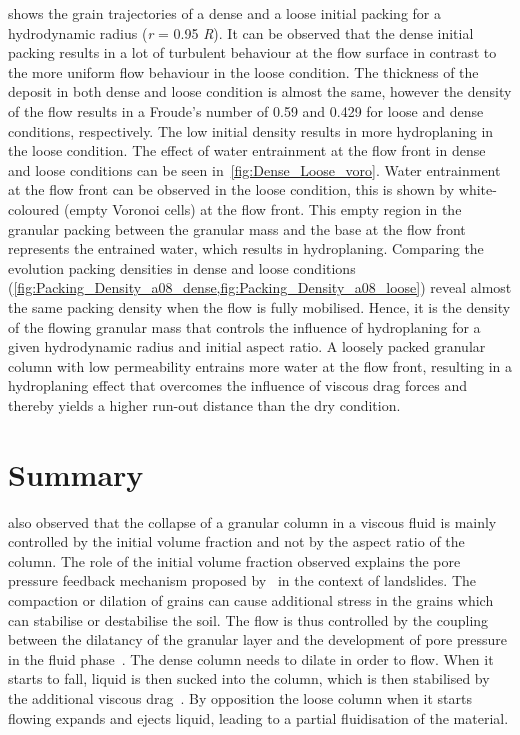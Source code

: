 \documentclass[12pt,a4paper,twocolumn,fleqn]{narms}
\begin{document}
 shows the grain trajectories of a dense and a loose 
initial packing for a hydrodynamic radius (\textit{r} = 0.95 \textit{R}). It 
can be observed that 
the dense initial packing results in a lot of turbulent behaviour at the flow 
surface in contrast to the more uniform flow behaviour in the loose condition. 
The thickness of the deposit in both dense and loose condition is almost the 
same, however the density of the flow results in a Froude's number of 0.59 and
0.429 for loose and dense conditions, respectively. The low initial density 
results in more hydroplaning in the loose condition. The effect of water 
entrainment at the flow front in dense and loose conditions can be seen 
in~\cref{fig:Dense_Loose_voro}. Water entrainment at the flow front can be 
observed in the loose condition, this is shown by white-coloured (empty Voronoi 
cells) at the flow front. This empty region in the granular packing between the 
granular mass and the base at the flow front represents the entrained water, 
which results in hydroplaning. Comparing the evolution packing densities in 
dense and loose conditions
(\cref{fig:Packing_Density_a08_dense,fig:Packing_Density_a08_loose}) 
reveal almost the same packing density when the flow is fully mobilised. Hence, 
it is the density of the flowing granular mass that controls the influence of 
hydroplaning for a given hydrodynamic radius and initial aspect ratio. A 
loosely packed granular column with low permeability entrains 
more water at the flow front, resulting in a hydroplaning effect that overcomes 
the influence of viscous drag forces and thereby yields a higher run-out 
distance than the dry condition.

\section{Summary}

 also observed that the collapse of a granular column in a 
viscous fluid is mainly controlled by the initial volume fraction and not by 
the aspect ratio of the column. The role of the initial volume fraction 
observed explains the pore pressure feedback mechanism proposed 
by~ in the context of landslides. The 
compaction or dilation of grains can cause additional stress in the grains 
which can stabilise or destabilise the soil. The flow is thus controlled by the 
coupling between the dilatancy of the granular layer and the development of 
pore pressure in the fluid phase~\cite{Pailha2008}. The dense column needs to 
dilate in order to flow. When it starts to fall, liquid is then sucked into the 
column, which is then stabilised by the additional viscous 
drag~\cite{Rondon2011,Topin2012}. By opposition the loose column when 
it starts flowing expands and ejects liquid, leading to a partial fluidisation 
of the material.
\end{document}
